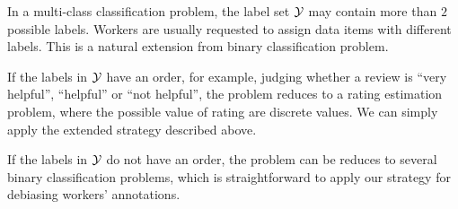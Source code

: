 In a multi-class classification problem, 
the label set ${\mathcal{Y}}$ may contain more than $2$ possible labels.  
Workers are usually requested to assign data items with different labels.  
This is a natural extension from binary classification problem.  

If the labels in ${\mathcal{Y}}$ have an order, 
for example, judging whether a review is ``very helpful'', ``helpful'' or ``not helpful'', 
the problem reduces to a rating estimation problem, 
where the possible value of rating are discrete values.  
We can simply apply the extended strategy described above.  

If the labels in ${\mathcal{Y}}$ do not have an order, 
the problem can be reduces to several binary classification problems, 
which is straightforward to apply our strategy for debiasing workers' annotations.  


